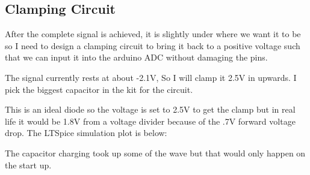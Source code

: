 \documentclass{article}
\begin{document}
\subsection{Clamping Circuit}
After the complete signal is achieved, it is slightly under where we want it to be so I need to design a clamping circuit to bring it back to a positive voltage such that we can input it into the arduino ADC without damaging the pins.

The signal currently rests at about -2.1V, So I will clamp it 2.5V in upwards. I pick the biggest capacitor in the kit for the circuit.
\begin{center}
\end{center}
This is an ideal diode so the voltage is set to 2.5V to get the clamp but in real life it would be 1.8V from a voltage divider because of the .7V forward voltage drop. The LTSpice simulation plot is below:
\begin{center}
\end{center}
The capacitor charging took up some of the wave but that would only happen on the start up.
\end{document}
